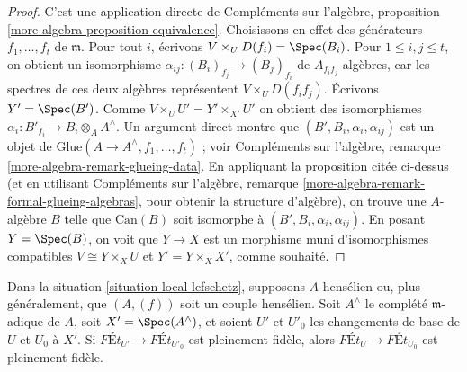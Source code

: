 \begin{proof}
C'est une application directe de
Compléments sur l'algèbre, proposition \ref{more-algebra-proposition-equivalence}.
Choisissons en effet des générateurs $f_1, \ldots, f_t$ de $\mathfrak m$.
Pour tout $i$, écrivons $V \times_U D(f_i) = \Spec(B_i)$.
Pour $1 \leq i, j \leq t$, on obtient un isomorphisme
$\alpha_{ij} : (B_i)_{f_j} \to (B_j)_{f_i}$ de $A_{f_if_j}$-algèbres,
car les spectres de ces deux algèbres représentent $V \times_U D(f_if_j)$.
Écrivons $Y' = \Spec(B')$. Comme $V \times_U U' = Y' \times_{X'} U'$
on obtient des isomorphismes $\alpha_i : B'_{f_i} \to B_i \otimes_A A^\wedge$.
Un argument direct montre que $(B', B_i, \alpha_i, \alpha_{ij})$
est un objet de $\text{Glue}(A \to A^\wedge, f_1, \ldots, f_t)$ ; voir
Compléments sur l'algèbre, remarque \ref{more-algebra-remark-glueing-data}.
En appliquant la proposition citée ci-dessus (et en utilisant
Compléments sur l'algèbre, remarque \ref{more-algebra-remark-formal-glueing-algebras},
pour obtenir la structure d'algèbre), on trouve une $A$-algèbre $B$ telle que
$\text{Can}(B)$ soit isomorphe à $(B', B_i, \alpha_i, \alpha_{ij})$.
En posant $Y = \Spec(B)$, on voit que $Y \to X$ est un morphisme
muni d'isomorphismes compatibles
$V \cong Y \times_X U$ et $Y' = Y \times_X X'$, comme souhaité.
\end{proof}

\begin{lemma}
\label{lemma-fully-faithful-henselian-completion}
Dans la situation \ref{situation-local-lefschetz}, supposons $A$ hensélien
ou, plus généralement, que $(A, (f))$ soit un couple hensélien.
Soit $A^\wedge$ le complété $\mathfrak m$-adique de $A$,
soit $X' = \Spec(A^\wedge)$, et soient $U'$ et $U'_0$ les changements de base de
$U$ et $U_0$ à $X'$. Si $\textit{F\'Et}_{U'} \to \textit{F\'Et}_{U'_0}$
est pleinement fidèle, alors $\textit{F\'Et}_U \to \textit{F\'Et}_{U_0}$
est pleinement fidèle.
\end{lemma}


